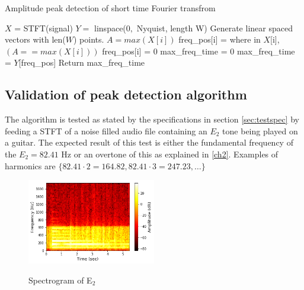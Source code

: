 \begin{algorithm}[H]
\caption{Amplitude peak detection of short time Fourier transfrom}
\label{alg:FIR}
\begin{algorithmic}[1] 
\State  $X$ = STFT(signal) 
\State $Y =$ linspace($0,$ Nyquist, length W) \Comment Generate linear spaced vectors with len($W$) points.
		\State $A = max(X[i])$ 
		 
			\State freq\_pos[i] = where in $X$[i], $(A == max(X[i]))$ 
		\Else
			\State freq\_pos[i] = 0	
		\EndIf
			\State max\_freq\_time = 0
		\Else
			\State max\_freq\_time = $Y$[freq\_pos]
		\EndIf
	\EndFor
	\State Return max\_freq\_time
\EndProcedure
\end{algorithmic}
\end{algorithm}

\subsection{Validation of peak detection algorithm}
The algorithm is tested as stated by the specifications in section \ref{sec:testspec} by feeding a STFT of a noise filled audio file containing an $E_2$ tone being played on a guitar. 
The expected result of this test is either the fundamental frequency of the $E_2 = 82.41$ Hz or an overtone of this as explained in \ref{ch2}. Examples of harmonics are $\{82.41 \cdot 2 = 164.82, 82.41 \cdot 3 = 247.23, \dots \}$ 

\begin{figure}[H]
\centering 
\includegraphics[width=0.5\textwidth]{figures/peak_detection/20170511_spectogram_E_2.png}
\label{fig:spec_E_2}
\caption{Spectrogram of E$_2$}
\end{figure}

